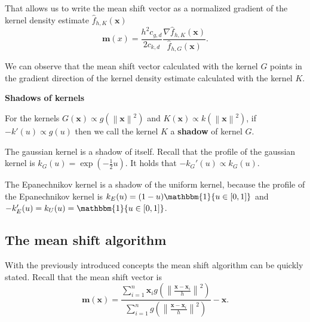 \documentclass{article}
\newcommand{\norm}[1]{\left\lVert#1\right\rVert}
\begin{document}
That allows us to write the mean shift vector as a normalized gradient of the kernel density estimate $\hat{f}_{h,K}(\bm{x})$
\begin{equation}
	\bm{m}(x) = \frac{h^2c_{g,d}}{2c_{k,d}} \frac{\nabla \hat{f}_{h,K}(\bm{x})}{\hat{f}_{h,G}(\bm{x})}\text{.}
\end{equation}

We can observe that the mean shift vector calculated with the kernel $G$ points in the gradient direction of the kernel density estimate calculated with the kernel $K$.

\textbf{Shadows of kernels}

For the kernels $G(\bm{x}) \propto g(\norm{\bm{x}}^2)$ and $K(\bm{x}) \propto k(\norm{\bm{x}}^2)$, if $-k'(u) \propto g(u)$ then we call the kernel $K$ a \textbf{shadow} of kernel $G$.

The gaussian kernel is a shadow of itself. Recall that the profile of the gaussian kernel is $k_G(u) = \exp\left(-\frac{1}{2}u\right)$. It holds that $-k_G'(u) \propto k_G(u)$.

The Epanechnikov kernel is a shadow of the uniform kernel, because the profile of the Epanechnikov kernel is $k_E(u) = (1 - u) \mathbbm{1}\{u \in [0, 1]\}$ and $-k_E'(u) = k_U(u) = \mathbbm{1}\{u \in [0, 1]\}$.





\subsection{The mean shift algorithm} \label{sec:mean-shift-algorithm}

With the previously introduced concepts the mean shift algorithm can be quickly stated. Recall that the mean shift vector is
\begin{equation}
\bm{m}(\bm{x}) = \frac{\sum_{i=1}^n \bm{x}_i g\left(\norm{\frac{\bm{x} - \bm{x}_i}{h}}^2 \right)}{\sum_{i=1}^n g\left(\norm{\frac{\bm{x} - \bm{x}_i}{h}}^2 \right)} - \bm{x}\text{.}
\end{equation}
\end{document}
